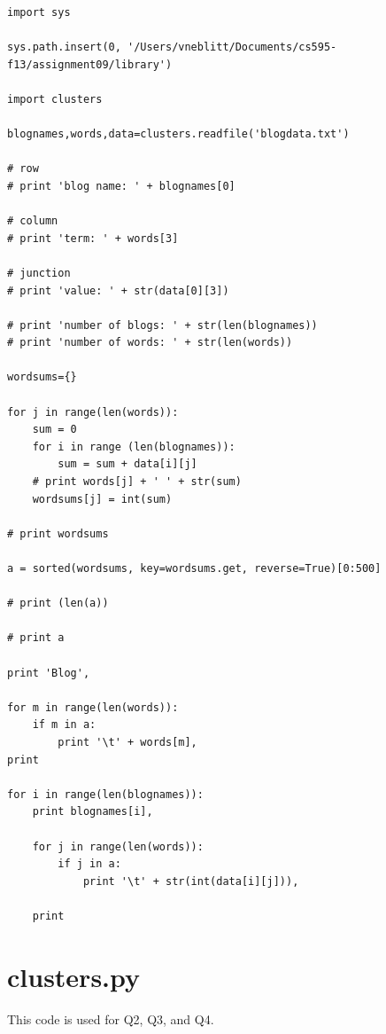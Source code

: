 \documentclass{article}
\begin{document}
\begin{lstlisting}[frame=single, caption=reduceTerms.py, label=reduceTerms]
import sys

sys.path.insert(0, '/Users/vneblitt/Documents/cs595-f13/assignment09/library')

import clusters

blognames,words,data=clusters.readfile('blogdata.txt')

# row
# print 'blog name: ' + blognames[0]

# column
# print 'term: ' + words[3]

# junction
# print 'value: ' + str(data[0][3])

# print 'number of blogs: ' + str(len(blognames))
# print 'number of words: ' + str(len(words))

wordsums={}

for j in range(len(words)):
	sum = 0
	for i in range (len(blognames)):
		sum = sum + data[i][j]
	# print words[j] + ' ' + str(sum)
	wordsums[j] = int(sum)
	
# print wordsums

a = sorted(wordsums, key=wordsums.get, reverse=True)[0:500]

# print (len(a))

# print a

print 'Blog',

for m in range(len(words)):
	if m in a:
		print '\t' + words[m],
print

for i in range(len(blognames)):
	print blognames[i],
		
	for j in range(len(words)):
		if j in a:
			print '\t' + str(int(data[i][j])),
			
	print
\end{lstlisting}

\section{clusters.py}

This code is used for Q2, Q3, and Q4.
\end{document}
